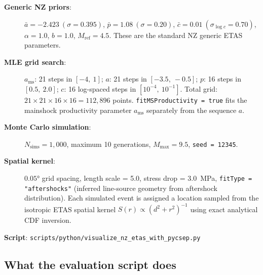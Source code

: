 \documentclass[12pt,a4paper]{article}
\begin{document}
\begin{description}
    \item[\textbf{Generic NZ priors}:]
        $\bar{a} = -2.423\ (\sigma = 0.395)$,
        $\bar{p} = 1.08\ (\sigma = 0.20)$,
        $\bar{c} = 0.01\ (\sigma_{\log c} = 0.70)$,
        $\alpha = 1.0$, $b = 1.0$, $M_\text{ref} = 4.5$.
        These are the standard NZ generic ETAS parameters.

    \item[\textbf{MLE grid search}:]
        $a_\text{ms}$: 21 steps in $[-4,\ 1]$;
        $a$: 21 steps in $[-3.5,\ -0.5]$;
        $p$: 16 steps in $[0.5,\ 2.0]$;
        $c$: 16 log-spaced steps in $[10^{-4},\ 10^{-1}]$.
        Total grid: $21 \times 21 \times 16 \times 16 = 112{,}896$ points.
        \texttt{fitMSProductivity = true} fits the mainshock productivity
        parameter $a_\text{ms}$ separately from the sequence $a$.

    \item[\textbf{Monte Carlo simulation}:]
        $N_\text{sims} = 1{,}000$, maximum 10 generations,
        $M_\text{max} = 9.5$, \texttt{seed = 12345}.

    \item[\textbf{Spatial kernel}:]
        $0.05°$ grid spacing, length scale = 5.0, stress drop = 3.0~MPa,
        \texttt{fitType = "aftershocks"} (inferred line-source geometry
        from aftershock distribution). Each simulated event is assigned a
        location sampled from the isotropic ETAS spatial kernel
        $S(r) \propto (d^2 + r^2)^{-1}$ using exact analytical CDF inversion.
\end{description}

\textbf{Script}: \texttt{scripts/python/visualize\_nz\_etas\_with\_pycsep.py}

\subsection{What the evaluation script does}
\end{document}
